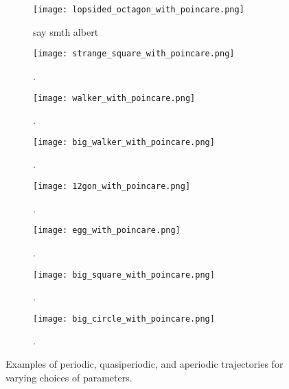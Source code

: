 \begin{figure}[!th]
\ContinuedFloat
\centering
\begin{subfigure}{0.49\textwidth}
\centering
\texttt{[image: lopsided\_octagon\_with\_poincare.png]}
\caption{say smth albert}
\label{subfig:periodicorbit11}
\end{subfigure}
%
\begin{subfigure}{0.49\textwidth}
\texttt{[image: strange\_square\_with\_poincare.png]}
\caption{.}
\label{subfig:periodicorbit12}
\end{subfigure}
%
\begin{subfigure}{0.49\textwidth}
\texttt{[image: walker\_with\_poincare.png]}
\caption{.}
\label{subfig:periodicorbit13}
\end{subfigure}
%
\begin{subfigure}{0.49\textwidth}
\texttt{[image: big\_walker\_with\_poincare.png]}
\caption{.}
\label{subfig:periodicorbit14}
\end{subfigure}
%
\begin{subfigure}{0.49\textwidth}
\texttt{[image: 12gon\_with\_poincare.png]}
\caption{.}
\label{subfig:periodicorbit15}
\end{subfigure}
%
\begin{subfigure}{0.49\textwidth}
\texttt{[image: egg\_with\_poincare.png]}
\caption{.}
\label{subfig:periodicorbit16}
\end{subfigure}
%
\begin{subfigure}{0.49\textwidth}
\texttt{[image: big\_square\_with\_poincare.png]}
\caption{.}
\label{subfig:periodicorbit17}
\end{subfigure}
%
\begin{subfigure}{0.49\textwidth}
\texttt{[image: big\_circle\_with\_poincare.png]}
\caption{.}
\label{subfig:periodicorbit18}
\end{subfigure}
\caption{Examples of periodic, quasiperiodic, and aperiodic trajectories for varying choices of parameters.}
\label{fig:periodicorbits1}
\end{figure}